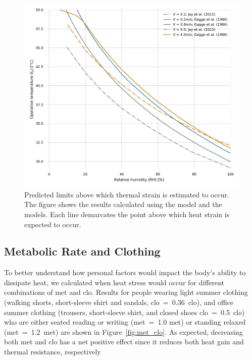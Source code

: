 \begin{figure}[thb!]
    \centering
    \includegraphics[width=\textwidth]{figures/comparison_air_speed}
    \caption{Predicted limits above which thermal strain is estimated to occur.
    The figure shows the results calculated using the  model and the  models.
    Each line demarcates the point above which heat strain is expected to occur.}
    \label{fig:comparison_air_speed}
\end{figure}

\subsection{Metabolic Rate and Clothing}\label{subsec:met-clo}

To better understand how personal factors would impact the body's ability to dissipate heat, we calculated when heat stress would occur for different combinations of \ac{met} and \ac{clo}.
Results for people wearing light summer clothing (walking shorts, short-sleeve shirt and sandals, \acs{clo}~=~0.36~clo), and office summer clothing (trousers, short-sleeve shirt, and closed shoes \acs{clo}~=~0.5~clo) who are either seated reading or writing (\ac{met}~=~1.0 met) or standing relaxed (\ac{met}~=~1.2~met) are shown in Figure~\ref{fig:met_clo}.
As expected, decreasing both \ac{met} and \ac{clo} has a net positive effect since it reduces both heat gain and thermal resistance, respectively

